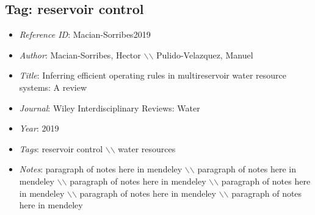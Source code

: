 \documentclass[11pt]{article}
\begin{document}
\subsection{Tag: reservoir control} 
\noindent\citep{Macian-Sorribes2019} 
\begin{itemize} 
\item{\textit{Reference ID}:  Macian-Sorribes2019} 

\item{\textit{Author}:  Macian-Sorribes, Hector $\backslash$$\backslash$ Pulido-Velazquez, Manuel} 

\item{\textit{Title}:  Inferring efficient operating rules in multireservoir water resource systems: A review} 

\item{\textit{Journal}:  Wiley Interdisciplinary Reviews: Water} 

\item{\textit{Year}:  2019} 

\item{\textit{Tags}:  reservoir control $\backslash$$\backslash$ water resources} 

\item{\textit{Notes}:  paragraph of notes here in mendeley $\backslash$$\backslash$ paragraph of notes here in mendeley $\backslash$$\backslash$ paragraph of notes here in mendeley $\backslash$$\backslash$ paragraph of notes here in mendeley $\backslash$$\backslash$ paragraph of notes here in mendeley $\backslash$$\backslash$ paragraph of notes here in mendeley} 

\end{itemize}\medskip
\end{document}
